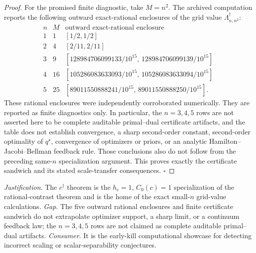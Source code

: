 \documentclass{article}
\begin{document}
\begin{proof}
For the promised finite diagnostic, take \(M=n^2\).  The archived computation reports the following outward exact-rational enclosures of the grid value \(\Lambda_{n,n^2}^\dagger\):
\[
\begin{array}{c|c|c}
n&M&\text{outward exact-rational enclosure}\\ \hline
1&1&[1/2,1/2]\\
2&4&[2/11,2/11]\\
3&9&[128984706099133/10^{15},\,128984706099139/10^{15}]\\
4&16&[105286083633093/10^{15},\,105286083633094/10^{15}]\\
5&25&[89011550888241/10^{15},\,89011550888250/10^{15}].
\end{array}
\]
These rational enclosures were independently corroborated numerically.  They are reported as finite diagnostics only.  In particular, the \(n=3,4,5\) rows are not asserted here to be complete auditable primal--dual certificate artifacts, and the table does not establish convergence, a sharp second-order constant, second-order optimality of \(q^\star\), convergence of optimizers or priors, or an analytic Hamilton--Jacobi--Bellman feedback rule.  Those conclusions also do not follow from the preceding same-\(n\) specialization argument.  This proves exactly the certificate sandwich and its stated scale-transfer consequences. \(\square\)
\end{proof}
\par\smallskip\noindent \textit{Justification.} The \(c^\dagger\) theorem is the \(h_c=1\), \(C_0(c)=1\) specialization of the rational-contrast theorem and is the home of the exact small-\(n\) grid-value calculations. \textit{Gap.} The five outward rational enclosures and finite certificate sandwich do not extrapolate optimizer support, a sharp limit, or a continuum feedback law; the \(n=3,4,5\) rows are not claimed as complete auditable primal--dual artifacts. \textit{Consumer.} It is the early-kill computational showcase for detecting incorrect scaling or scalar-separability conjectures.
\end{document}
